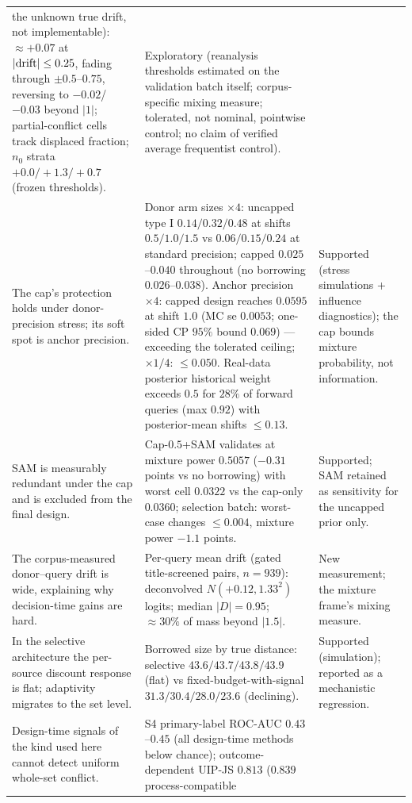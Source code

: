 \documentclass[11pt]{article}
\begin{document}
\begin{longtable}{p{} p{} p{}}
the unknown true drift, not implementable): $\approx +0.07$ at
$|{\rm drift}| \le 0.25$, fading through $\pm 0.5$--$0.75$, reversing to
$-0.02$/$-0.03$ beyond $|1|$; partial-conflict cells track displaced
fraction; $n_0$ strata $+0.0/+1.3/+0.7$ (frozen thresholds). &
Exploratory
(reanalysis thresholds estimated on the validation batch itself;
corpus-specific mixing measure; tolerated, not nominal, pointwise
control; no claim of verified average frequentist control). \\
The cap's protection holds under donor-precision stress; its soft spot is
anchor precision. & Donor arm sizes $\times 4$: uncapped type I
$0.14/0.32/0.48$ at shifts $0.5/1.0/1.5$ vs $0.06/0.15/0.24$ at standard
precision; capped $0.025$--$0.040$ throughout (no borrowing
$0.026$--$0.038$). Anchor precision $\times 4$: capped design reaches
$0.0595$ at shift $1.0$ (MC se $0.0053$; one-sided CP $95\%$ bound
$0.069$) --- exceeding the tolerated ceiling; $\times 1/4$: $\le 0.050$.
Real-data posterior
historical weight exceeds $0.5$ for $28\%$ of forward queries (max
$0.92$) with posterior-mean shifts $\le 0.13$. & Supported (stress
simulations + influence diagnostics); the cap bounds mixture probability,
not information. \\
SAM is measurably redundant under the cap and is excluded from the final
design. & Cap-$0.5$+SAM validates at mixture power $0.5057$ ($-0.31$
points vs no borrowing) with worst cell $0.0322$ vs the cap-only
$0.0360$; selection batch: worst-case changes $\le 0.004$, mixture power
$-1.1$ points. & Supported; SAM retained as sensitivity for the uncapped
prior only. \\
The corpus-measured donor--query drift is wide, explaining why
decision-time gains are hard. & Per-query mean drift (gated
title-screened pairs, $n=939$): deconvolved $N(+0.12, 1.33^2)$ logits;
median $|D| = 0.95$; $\approx 30\%$ of mass beyond $|1.5|$. & New
measurement; the mixture frame's mixing measure. \\
In the selective architecture the per-source discount response is flat;
adaptivity migrates to the set level. & Borrowed size by true distance:
selective $43.6/43.7/43.8/43.9$ (flat) vs fixed-budget-with-signal
$31.3/30.4/28.0/23.6$ (declining). & Supported (simulation); reported as a
mechanistic regression. \\
Design-time signals of the kind used here cannot detect uniform whole-set
conflict. & S4 primary-label ROC-AUC $0.43$--$0.45$ (all design-time methods
below chance); outcome-dependent UIP-JS $0.813$ ($0.839$ process-compatible

\end{longtable}
\end{document}
